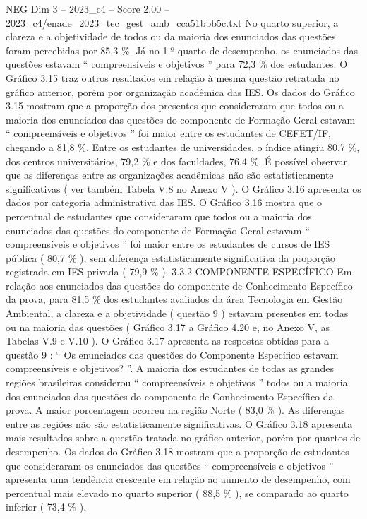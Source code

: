 \begin{textsample}{NEG Dim 3 – 2023\_c4 – Score 2.00 – 2023\_c4/enade\_2023\_tec\_gest\_amb\_cca51bbb5c.txt}
No quarto superior, a clareza e a objetividade de todos ou da maioria dos enunciados das questões foram percebidas por 85,3 \%.
Já no 1.º quarto de desempenho, os enunciados das questões estavam “ compreensíveis e objetivos ” para 72,3 \% dos estudantes.
O Gráfico 3.15 traz outros resultados em relação à mesma questão retratada no gráfico anterior, porém por organização acadêmica das IES.
Os dados do Gráfico 3.15 mostram que a proporção dos presentes que consideraram que todos ou a maioria dos enunciados das questões do componente de Formação Geral estavam “ compreensíveis e objetivos ” foi maior entre os estudantes de CEFET/IF, chegando a 81,8 \%.
Entre os estudantes de universidades, o índice atingiu 80,7 \%, dos centros universitários, 79,2 \% e dos faculdades, 76,4 \%.
É possível observar que as diferenças entre as organizações acadêmicas não são estatisticamente significativas ( ver também Tabela V.8 no Anexo V ).
O Gráfico 3.16 apresenta os dados por categoria administrativa das IES.
O Gráfico 3.16 mostra que o percentual de estudantes que consideraram que todos ou a maioria dos enunciados das questões do componente de Formação Geral estavam “ compreensíveis e objetivos ” foi maior entre os estudantes de cursos de IES pública ( 80,7 \% ), sem diferença estatisticamente significativa da proporção registrada em IES privada ( 79,9 \% ). 3.3.2 COMPONENTE ESPECÍFICO Em relação aos enunciados das questões do componente de Conhecimento Específico da prova, para 81,5 \% dos estudantes avaliados da área Tecnologia em Gestão Ambiental, a clareza e a objetividade ( questão 9 ) estavam presentes em todas ou na maioria das questões ( Gráfico 3.17 a Gráfico 4.20 e, no Anexo V, as Tabelas V.9 e V.10 ).
O Gráfico 3.17 apresenta as respostas obtidas para a questão 9 : “ Os enunciados das questões do Componente Específico estavam compreensíveis e objetivos? ”.
A maioria dos estudantes de todas as grandes regiões brasileiras considerou “ compreensíveis e objetivos ” todos ou a maioria dos enunciados das questões do componente de Conhecimento Específico da prova.
A maior porcentagem ocorreu na região Norte ( 83,0 \% ).
As diferenças entre as regiões não são estatisticamente significativas.
O Gráfico 3.18 apresenta mais resultados sobre a questão tratada no gráfico anterior, porém por quartos de desempenho.
Os dados do Gráfico 3.18 mostram que a proporção de estudantes que consideraram os enunciados das questões “ compreensíveis e objetivos ” apresenta uma tendência crescente em relação ao aumento de desempenho, com percentual mais elevado no quarto superior ( 88,5 \% ), se comparado ao quarto inferior ( 73,4 \% ).

\end{textsample}
